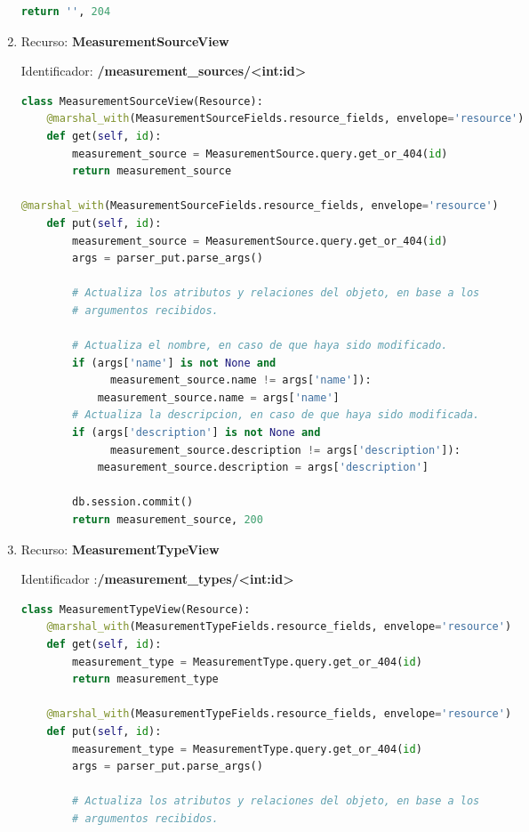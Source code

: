 \documentclass[a4paper,12pt]{article}
\begin{document}
\begin{enumerate}
\begin{lstlisting}[language=Python]
        return '', 204
\end{lstlisting}

\item Recurso: \textbf{MeasurementSourceView}

Identificador: \textbf{/measurement\_sources/<int:id>}

\begin{lstlisting}[language=Python]
class MeasurementSourceView(Resource):
    @marshal_with(MeasurementSourceFields.resource_fields, envelope='resource')
    def get(self, id):
        measurement_source = MeasurementSource.query.get_or_404(id)
        return measurement_source

@marshal_with(MeasurementSourceFields.resource_fields, envelope='resource')
    def put(self, id):
        measurement_source = MeasurementSource.query.get_or_404(id)
        args = parser_put.parse_args()

        # Actualiza los atributos y relaciones del objeto, en base a los
        # argumentos recibidos.

        # Actualiza el nombre, en caso de que haya sido modificado.
        if (args['name'] is not None and
              measurement_source.name != args['name']):
            measurement_source.name = args['name']
        # Actualiza la descripcion, en caso de que haya sido modificada.
        if (args['description'] is not None and
              measurement_source.description != args['description']):
            measurement_source.description = args['description']

        db.session.commit()
        return measurement_source, 200
\end{lstlisting}

\item Recurso: \textbf{MeasurementTypeView}

Identificador :\textbf{/measurement\_types/<int:id>}

\begin{lstlisting}[language=Python]
class MeasurementTypeView(Resource):
    @marshal_with(MeasurementTypeFields.resource_fields, envelope='resource')
    def get(self, id):
        measurement_type = MeasurementType.query.get_or_404(id)
        return measurement_type

    @marshal_with(MeasurementTypeFields.resource_fields, envelope='resource')
    def put(self, id):
        measurement_type = MeasurementType.query.get_or_404(id)
        args = parser_put.parse_args()

        # Actualiza los atributos y relaciones del objeto, en base a los
        # argumentos recibidos.


\end{lstlisting}
\end{enumerate}
\end{document}
